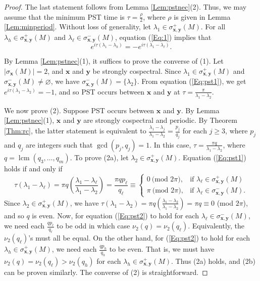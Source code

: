 \documentclass[11pt]{article}
\newcommand{\bx}{\mathbf x}
\newcommand{\by}{\mathbf y}
\begin{document}
\begin{proof}
The last statement follows from Lemma \ref{Lem:pstnec}(2). Thus, we may assume that the minimum PST time is $\tau=\frac{\rho}{2}$, where $\rho$ is given in Lemma \ref{Lem:minperiod}. Without loss of generality, let $\lambda_1\in\sigma_{\bx,\by}^+(M)$. For all $\lambda_h\in\sigma_{\bx,\by}^+(M)$ and $\lambda_{\ell}\in\sigma_{\bx,\by}^-(M)$, equation (\ref{Eq:1}) implies that
\begin{equation}
\label{Eq:pst1}
e^{i\tau(\lambda_1-\lambda_h)}=-e^{i\tau(\lambda_1-\lambda_{\ell})}.
\end{equation}

By Lemma \ref{Lem:pstnec}(1), it suffices to prove the converse of (1). Let $|\sigma_{\bx}(M)|=2$, and $\bx$ and $\by$ be strongly cospectral. Since $\lambda_1\in\sigma_{\bx,\by}^+(M)$ and $\sigma_{\bx,\by}^-(M)\neq \varnothing$, we have $\sigma_{\bx,\by}^-(M)=\{\lambda_2\}$. From equation (\ref{Eq:pst1}), we get $e^{i\tau(\lambda_1-\lambda_2)}=-1$, and so PST occurs between $\bx$ and $\by$ at $\tau=\frac{\pi}{\lambda_1-\lambda_2}$.

We now prove (2). Suppose PST occurs between $\bx$ and $\by$. By Lemma \ref{Lem:pstnec}(1), $\bx$ and $\by$ are strongly cospectral and periodic. By Theorem \ref{Thm:rc}, the latter statement is equivalent to $\frac{\lambda_1-\lambda_j}{\lambda_1-\lambda_2}=\frac{p_j}{q_j}$ for each $j\geq 3$, where $p_j$ and $q_j$ are integers such that $\operatorname{gcd}(p_j,q_j)=1$. In this case, $\tau=\frac{\pi q}{\lambda_1-\lambda_2}$, where $q=\operatorname{lcm}(q_3,\ldots,q_{m})$.
To prove (2a), let %
$\lambda_2\in \sigma_{\bx,\by}^+(M)$. Equation (\ref{Eq:pst1}) holds if and only if
\begin{equation}
\label{Eq:pst2}
    \tau\left(\lambda_1-\lambda_{\ell}\right)=\pi q\left(\frac{\lambda_1-\lambda_{\ell}}{\lambda_1-\lambda_2}\right)=\frac{\pi q p_{\ell}}{q_{\ell}}\equiv
\begin{cases}
    0\ \text{(mod $2\pi$)},& \text{if } \lambda_{\ell}\in \sigma_{\bx,\by}^+(M)\\
    \pi\ \text{(mod $2\pi$)},& \text{if } \lambda_{\ell}\in \sigma_{\bx,\by}^-(M).
\end{cases}
\end{equation}
Since $\lambda_2\in \sigma_{\bx,\by}^+(M)$, we have $\tau\left(\lambda_1-\lambda_{2}\right)=\pi q\left(\frac{\lambda_1-\lambda_{2}}{\lambda_1-\lambda_2}\right)=\pi q\equiv 0$ (mod $2\pi$), and so $q$ is even. Now, for equation (\ref{Eq:pst2}) to hold for each $\lambda_{\ell}\in \sigma_{\bx,\by}^-(M)$, we need each $\frac{qp_{\ell}}{q_{\ell}}$ to be odd in which case $\nu_2(q)=\nu_2(q_{\ell})$. Equivalently, the $\nu_2(q_{\ell})$'s must all be equal. On the other hand, for (\ref{Eq:pst2}) to hold for each $\lambda_h\in \sigma_{\bx,\by}^+(M)$, we need each $\frac{qp_{h}}{q_{h}}$ to be even. That is, we must have $\nu_2(q)=\nu_2(q_{\ell})>\nu_2(q_{h})$ for each $\lambda_h\in \sigma_{\bx,\by}^+(M)$. Thus (2a) holds, and (2b) can be proven similarly. The converse of (2) is straightforward.
\end{proof}
\end{document}
